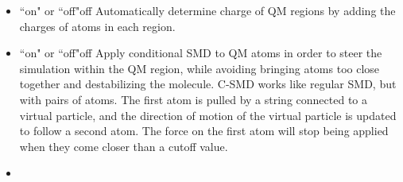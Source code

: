 \begin{itemize}
\item
{}%
{``on" or ``off"}{off}{%
Automatically determine charge of QM regions by adding the charges of 
atoms in each region.
}

\item
{}%
{``on" or ``off"}{off}{%
Apply conditional SMD to QM atoms in order to steer the simulation 
within the QM region, while avoiding bringing atoms too close together 
and destabilizing the molecule. C-SMD works like regular SMD, but 
with pairs of atoms. The first atom is pulled by a string connected 
to a virtual particle, and the direction of motion of the virtual 
particle is updated to follow a second atom. The force on the first 
atom will stop being applied when they come closer than a cutoff value.
}

\item
{}

\end{itemize}

